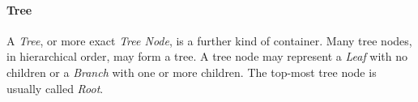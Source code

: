 %
%
%
%
%
%
%

\paragraph{Tree}
\label{tree_heading}

A \emph{Tree}, or more exact \emph{Tree Node}, is a further kind of container.
Many tree nodes, in hierarchical order, may form a tree. A tree node may
represent a \emph{Leaf} with no children or a \emph{Branch} with one or more
children. The top-most tree node is usually called \emph{Root}.
